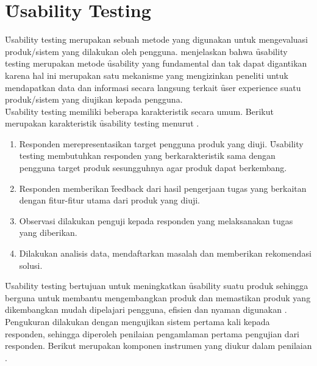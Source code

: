 \section{\f{Usability Testing}}\label{subsec:ust}
\f{Usability testing} merupakan sebuah metode yang digunakan untuk mengevaluasi produk/sistem yang dilakukan oleh pengguna. \citet{article.nielsen} menjelaskan bahwa \f{usability testing} merupakan metode \f{usability} yang fundamental dan tak dapat digantikan karena hal ini merupakan satu mekanisme yang mengizinkan peneliti untuk mendapatkan data dan informasi secara langsung terkait \f{user experience} suatu produk/sistem yang diujikan kepada pengguna.
\newline\\
\f{Usability testing} memiliki beberapa karakteristik secara umum. Berikut merupakan karakteristik \f{usability} testing menurut \citet{buku.dumas}.
\begin{enumerate}
	\item Responden merepresentasikan target pengguna produk yang diuji. \f{Usability testing} membutuhkan responden yang berkarakteristik sama dengan pengguna target produk sesungguhnya agar produk dapat berkembang. 
	\item Responden memberikan \f{feedback} dari hasil pengerjaan tugas yang berkaitan dengan fitur-fitur utama dari produk yang diuji.
	\item Observasi dilakukan penguji kepada responden yang melaksanakan tugas yang diberikan.
	\item Dilakukan analisis data, mendaftarkan masalah dan memberikan rekomendasi solusi.
\end{enumerate}
\f{Usability testing} bertujuan untuk meningkatkan \f{usability} suatu produk sehingga berguna untuk membantu mengembangkan produk dan memastikan produk yang dikembangkan mudah dipelajari pengguna, efisien dan nyaman digunakan \citep{buku.rubin}.
\newline\\
Pengukuran \ust \space dilakukan dengan mengujikan sistem pertama kali kepada responden, sehingga diperoleh penilaian pengamlaman pertama pengujian dari responden. Berikut merupakan komponen instrumen yang diukur dalam penilaian \ust.
